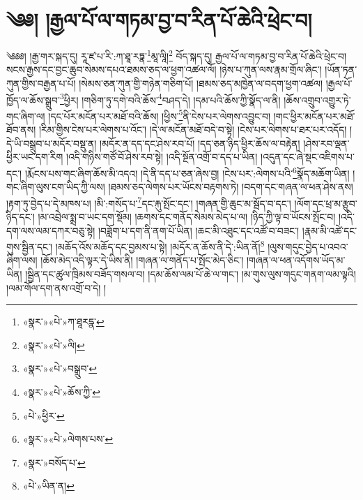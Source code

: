 \chapter{༄༅། །རྒྱལ་པོ་ལ་གཏམ་བྱ་བ་རིན་པོ་ཆེའི་ཕྲེང་བ།}༄༅༅། །རྒྱ་གར་སྐད་དུ། རཱ་ཛ་པ་རི་:ཀ་ཐཱ་རཏྣ་\footnote{«སྣར་»«པེ་»ཀ་ཐཱརདྣ་}མཱ་ལཱི།\footnote{«སྣར་»«པེ་»ལི།} བོད་སྐད་དུ། རྒྱལ་པོ་ལ་གཏམ་བྱ་བ་རིན་པོ་ཆེའི་ཕྲེང་བ། སངས་རྒྱས་དང་བྱང་ཆུབ་སེམས་དཔའ་ཐམས་ཅད་ལ་ཕྱག་འཚལ་ལོ། །ཉེས་པ་ཀུན་ལས་རྣམ་གྲོལ་ཞིང་། །ཡོན་ཏན་ཀུན་གྱིས་བརྒྱན་པ་པོ། །སེམས་ཅན་ཀུན་གྱི་གཉེན་གཅིག་པོ། །ཐམས་ཅད་མཁྱེན་ལ་བདག་ཕྱག་འཚལ། །རྒྱལ་པོ་ཁྱོད་ལ་ཆོས་སྒྲུབ་\footnote{«སྣར་»«པེ་»བསྒྲུབ་}ཕྱིར། །གཅིག་ཏུ་དགེ་བའི་ཆོས་\footnote{«སྣར་»«པེ་»ཆོས་ཀྱི་}བཤད་དེ། །དམ་པའི་ཆོས་ཀྱི་སྣོད་ལ་ནི། །ཆོས་འགྲུབ་འགྱུར་ཏེ་གང་ཞིག་ལ། །དང་པོར་མངོན་པར་མཐོ་བའི་ཆོས། །ཕྱིས་\footnote{«པེ་»ཕྱིར་}ནི་ངེས་པར་ལེགས་འབྱུང་བ། །གང་ཕྱིར་མངོན་པར་མཐོ་ཐོབ་ནས། །རིམ་གྱིས་ངེས་པར་ལེགས་པ་འོང་། །དེ་ལ་མངོན་མཐོ་བདེ་བ་སྟེ། །ངེས་པར་ལེགས་པ་ཐར་པར་འདོད། །དེ་ཡི་བསྒྲུབ་པ་མདོར་བསྡུ་ན། །མདོར་ན་དད་དང་ཤེས་རབ་པོ། །དད་ཅན་ཉིད་ཕྱིར་ཆོས་ལ་བརྟེན། །ཤེས་རབ་ལྡན་ཕྱིར་ཡང་དག་རིག །འདི་གཉིས་གཙོ་བོ་ཤེས་རབ་སྟེ། །འདི་སྔོན་འགྲོ་བ་དད་པ་ཡིན། །འདུན་དང་ཞེ་སྡང་འཇིགས་པ་དང་། །རྨོངས་པས་གང་ཞིག་ཆོས་མི་འདའ། །དེ་ནི་དད་པ་ཅན་ཞེས་བྱ། །ངེས་པར་:ལེགས་པའི་\footnote{«སྣར་»«པེ་»ལེགས་པས་}སྣོད་མཆོག་ཡིན། །གང་ཞིག་ལུས་ངག་ཡིད་ཀྱི་ལས། །ཐམས་ཅད་ལེགས་པར་ཡོངས་བརྟགས་ཏེ། །བདག་དང་གཞན་ལ་ཕན་ཤེས་ནས། །རྟག་ཏུ་བྱེད་པ་དེ་མཁས་པ། །མི་:གསོད་པ་\footnote{«སྣར་»བསོད་པ་}དང་རྐུ་སྤོང་དང་། །གཞན་གྱི་ཆུང་མ་སྦོད་བ་དང་། །ལོག་དང་ཕྲ་མ་རྩུབ་ཉིད་དང་། །མ་འབྲེལ་སྨྲ་བ་ཡང་དག་སྡོམ། །ཆགས་དང་གནོད་སེམས་མེད་པ་ལ། །ཉིད་ཀྱི་ལྟ་བ་ཡོངས་སྤོང་བ། །འདི་དག་ལས་ལམ་དཀར་བཅུ་སྟེ། །བཟློག་པ་དག་ནི་ནག་པོ་ཡིན། །ཆང་མི་འཐུང་དང་འཚོ་བ་བཟང་། །རྣམ་མི་འཚེ་དང་གུས་སྦྱིན་དང་། །མཆོད་འོས་མཆོད་དང་བྱམས་པ་སྟེ། །མདོར་ན་ཆོས་ནི་དེ་:ཡིན་ནོ།\footnote{«པེ་»ཡིན་ན།} །ལུས་གདུང་བྱེད་པ་འབའ་ཞིག་ལས། །ཆོས་མེད་འདི་ལྟར་དེ་ཡིས་ནི། །གཞན་ལ་གནོད་པ་སྤོང་མེད་ཅིང་། །གཞན་ལ་ཕན་འདོགས་ཡོད་མ་ཡིན། །སྦྱིན་དང་ཚུལ་ཁྲིམས་བཟོད་གསལ་བ། །དམ་ཆོས་ལམ་པོ་ཆེ་ལ་གང་། །མ་གུས་ལུས་གདུང་གནག་ལམ་ལྟའི། །ལམ་གོལ་དག་ནས་འགྲོ་བ་དེ། །
